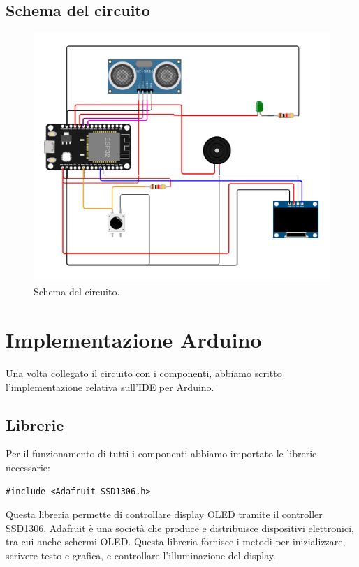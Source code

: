 \subsection{Schema del circuito}
\begin{figure}[h]
    \centering 
    \includegraphics[scale=.6]{img/sketch.png}
    \caption{Schema del circuito.}
    \label{fig:my_label}
\end{figure} 

\section{Implementazione Arduino}

Una volta collegato il circuito con i componenti, abbiamo scritto l'implementazione relativa sull'IDE per Arduino. 

\subsection{Librerie}

Per il funzionamento di tutti i componenti abbiamo importato le librerie necessarie: 

\begin{verbatim}
#include <Adafruit_SSD1306.h> 
\end{verbatim} 

Questa libreria permette di controllare display OLED tramite il controller SSD1306. Adafruit è una società che produce e distribuisce dispositivi elettronici, tra cui anche schermi OLED. Questa libreria fornisce i metodi per inizializzare, scrivere testo e grafica, e controllare l'illuminazione del display.

